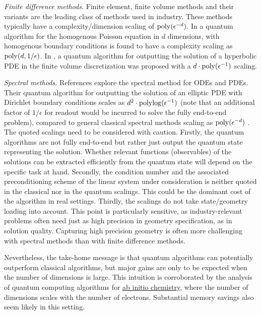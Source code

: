 \begin{refsection}
\textit{Finite difference methods.} Finite element, finite volume methods and their variants are the leading class of methods used in industry. These methods typically have a complexity/dimension scaling of ${\rm poly}(\epsilon^{-d})$. In \cite{montanaro2016quantum} a quantum algorithm for the homogenous Poisson equation in $d$ dimensions, with homogenous boundary conditions is found to have a complexity scaling as ${\rm poly}(d,1/\epsilon)$.
In \cite{fillion2019simple}, a quantum algorithm for outputting the solution of a hyperbolic PDE  in the finite volume discretization was proposed with a $d \cdot {\rm poly}(\epsilon^{-1})$ scaling. 

\textit{Spectral methods.} References \cite{childs2020quantum,childs2021high} explore the spectral method for ODEs and PDEs. Their quantum algorithm for outputting the solution of an elliptic PDE with Dirichlet boundary conditions scales as $d^2 \cdot {\rm polylog}(\epsilon^{-1})$ (note that an additional factor of $1/\epsilon$ for readout would be incurred to solve the fully end-to-end problem), compared to general classical spectral methods scaling as ${\rm poly}(\epsilon^{-d})$ \cite{shen2011spectral}.\\

The quoted scalings need to be considered with caution. Firstly, the quantum algorithms are not fully end-to-end but rather just output the quantum state representing the solution. Whether relevant functions (observables) of the solutions can be extracted efficiently from the quantum state will depend on the specific task at hand. Secondly, the condition number and the associated preconditioning scheme of the linear system under consideration is neither quoted in the classical  nor in the quantum scalings. This could be the dominant cost of the algorithm in real settings. Thirdly, the scalings do not take state/geometry loading into account. This point is particularly sensitive, as industry-relevant problems often need just as high precision in geometry specification, as in solution quality. Capturing high precision geometry is often more challenging with spectral methods than with finite difference methods.  

Nevertheless, the take-home message  is that quantum algorithms can potentially outperform classical algorithms, but major gains are only to be expected when the number of  dimensions is  large. This intuition is corroborated by the analysis of quantum computing algorithms for \hyperref[appl:QuantumChemistry]{ab initio chemistry}, where the number of dimensions scales with the number of electrons. Substantial memory savings also seem likely in this setting. 





\end{refsection}
